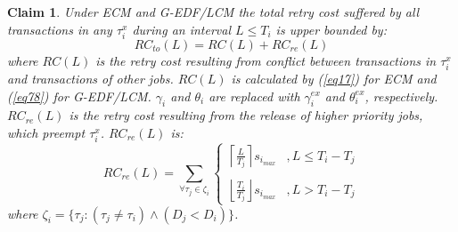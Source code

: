 \documentclass[12pt,english]{report}
\newtheorem{clm}{Claim}
\begin{document}
\begin{clm}\label{ecm rlease conflict}
Under ECM and G-EDF/LCM the total retry cost suffered by all transactions in any $\tau_i^x$ during an interval $L\le T_i$ is upper bounded by:
\begin{equation}
RC_{to}(L)=RC(L)+RC_{re}(L)
\label{total rc ecm eq}
\end{equation}
where $RC(L)$ is the retry cost resulting from conflict between transactions in $\tau_i^x$ and transactions of other jobs. $RC(L)$ is calculated by (\ref{eq17}) for ECM and (\ref{eq78}) for G-EDF/LCM. $\gamma_i$ and $\theta_i$ are replaced with $\gamma_i^{ex}$ and $\theta_i^{ex}$, respectively. $RC_{re}(L)$ is the retry cost resulting from the release of higher priority jobs, which preempt $\tau_i^x$. $RC_{re}(L)$ is:
\begin{equation}
RC_{re}(L)=\sum_{\forall \tau_{j}\in\zeta_{i}}\begin{cases}
\left\lceil \frac{L}{T_{j}}\right\rceil s_{i_{max}} & ,L\le T_{i}-T_{j}\\\\
\left\lfloor \frac{T_{i}}{T_{j}}\right\rfloor s_{i_{max}} & ,L>T_{i}-T_{j}
\end{cases}\label{eq6}
\end{equation}
%
where $\zeta_i=\{\tau_j:\left(\tau_j \ne \tau_i\right)\wedge \left(D_j < D_i \right)\}$.
\end{clm}
\end{document}
